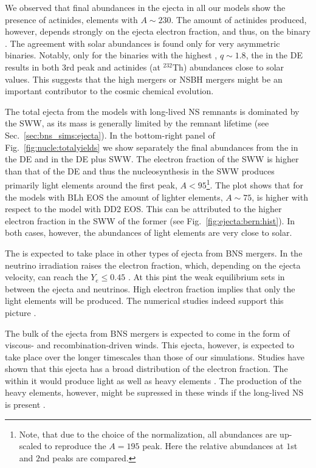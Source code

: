 We observed that final abundances in the ejecta in all our models show the 
presence of actinides, elements with $A\sim230$. 
The amount of actinides produced, however, depends strongly on the ejecta 
electron fraction, and thus, on the binary \mr{}.
The agreement with solar abundances is found only for very asymmetric binaries. 
Notably, only for the binaries with the highest \mr{}, $q\sim1.8$, the 
\rproc{} in the \ac{DE} results in both $3$rd peak and actinides (at $^{232}$Th) abundances 
close to solar values. 
This suggests that the high \mr{} mergers or \ac{NSBH} mergers might be an 
important contributor to the cosmic chemical evolution.

The total ejecta from the models with long-lived \ac{NS} remnants is dominated by
the \ac{SWW}, as its mass is generally limited by the remnant lifetime 
(see Sec.~\ref{sec:bns_sims:ejecta}). 
In the bottom-right panel of Fig.~\ref{fig:nucle:totalyields} we show separately the 
final abundances from the \rproc{} in the \ac{DE} and in the \ac{DE} plus \ac{SWW}. 
The electron fraction of the \ac{SWW} is higher than that of the \ac{DE} 
and thus the \rproc{} nucleosynthesis in the 
\ac{SWW} produces primarily light elements around the first \rproc{} peak, $A<95$\footnote{
    Note, that due to the choice of the normalization, all abundances are up-scaled 
    to reproduce the $A=195$ peak. Here the relative abundances at $1$st and $2$nd
    \rproc{} peaks are compared.
}.
%
The plot shows that for the models with BLh \ac{EOS} the amount of lighter elements, 
$A\sim75$, is higher with respect to the model with DD2 \ac{EOS}. This can be attributed 
to the higher electron fraction in the \ac{SWW} of the former (see Fig.~\ref{fig:ejecta:bern:hist}).
In both cases, however, the abundances of light elements are very close to solar. 


The \rproc{} is expected to take place in other types of ejecta from \ac{BNS} mergers.
In \nwind{} the neutrino irradiation raises the electron fraction, which, depending 
on the ejecta velocity, can reach the $Y_e\leq 0.45$ \citep{Qian:1996xt}. 
At this pint the weak equilibrium sets in between the ejecta and neutrinos.
High electron fraction implies that only the light elements will be produced.
The numerical studies indeed support this picture 
\citep{Dessart:2008zd,Perego:2014fma,Just:2014fka,Martin:2015hxa,Foucart:2016rxm}. 

The bulk of the ejecta from \ac{BNS} mergers is expected to come in the form of 
viscous- and recombination-driven winds. This ejecta, however, is expected to take 
place over the longer timescales than those of our simulations.
Studies have shown that this ejecta has a broad distribution of the electron fraction.
The \rproc{} \nuc{} within it would produce light as well as heavy elements
\citep{Fernandez:2013tya,Just:2014fka,Wu:2016pnw,Siegel:2017nub,Fujibayashi:2017puw,Fernandez:2018kax}.
The production of the heavy \rproc{} elements, however, might be supressed in these winds
if the long-lived \ac{NS} is present \citep{Metzger:2014ila,Lippuner:2017bfm}.